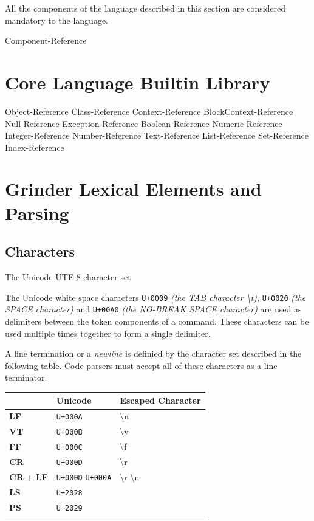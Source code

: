 \documentclass [10pt]{article}
\begin{document}
All the components of the language described in this section are considered
mandatory to the language.

 {Component-Reference}

\newpage
\section {Core Language Builtin Library}
 {Object-Reference}
 {Class-Reference}
 {Context-Reference}
 {BlockContext-Reference}
 {Null-Reference}
 {Exception-Reference}
 {Boolean-Reference}
 {Numeric-Reference}
 {Integer-Reference}
 {Number-Reference}
 {Text-Reference}
 {List-Reference}
 {Set-Reference}
 {Index-Reference}

\newpage
\section {Grinder Lexical Elements and Parsing}
\subsection {Characters}
The Unicode UTF-8 character set

The Unicode white space characters \texttt{U+0009}
\textit{(the TAB character \textbackslash t)}, \texttt{U+0020}
\textit{(the SPACE character)} and
\texttt{U+00A0} \textit{(the NO-BREAK SPACE character)} are used as delimiters
between the token components of a command. These characters can be used
multiple times together to form a single delimiter.

A line termination or a \textit{newline} is definied by the character set
described in the following table. Code parsers must accept all of these
characters as a line terminator.

\begin{center}
  \begin{tabular}{|l|l|l|}
  	\hline
  	                          & \textbf{Unicode}                & \textbf{Escaped Character}        \\ \hline
  	\textbf{LF}               & \texttt{U+000A}                 & \textbackslash n                  \\ \hline
  	\textbf{VT}               & \texttt{U+000B}                 & \textbackslash v                  \\ \hline
  	\textbf{FF}               & \texttt{U+000C}                 & \textbackslash f                  \\ \hline
  	\textbf{CR}               & \texttt{U+000D}                 & \textbackslash r                  \\ \hline
  	\textbf{CR} + \textbf{LF} & \texttt{U+000D} \texttt{U+000A} & \textbackslash r \textbackslash n \\ \hline
  	\textbf{LS}               & \texttt{U+2028}                 &  \\ \hline
  	\textbf{PS}               & \texttt{U+2029}                 &  \\ \hline
  \end{tabular}
\end{center}
\end{document}
